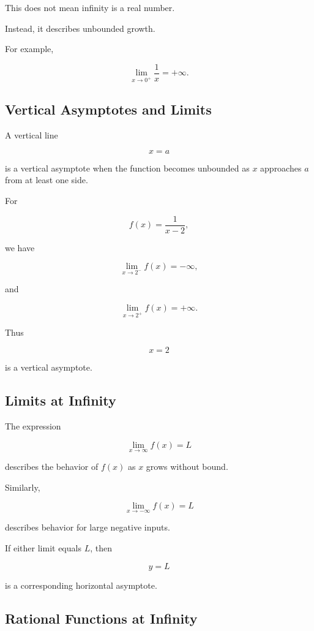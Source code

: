 This does not mean infinity is a real number.

Instead, it describes unbounded growth.

For example,

\[ \lim_{x\to0^+}\frac1x=+\infty. \]

\subsection{Vertical Asymptotes and Limits}
\label{subsec:vertical-asymptotes-limits}

A vertical line

\[ x=a \]

is a vertical asymptote when the function becomes unbounded as \(x\)
approaches \(a\) from at least one side.

For

\[ f(x)=\frac1{x-2}, \]

we have

\[ \lim_{x\to2^-}f(x)=-\infty, \]

and

\[ \lim_{x\to2^+}f(x)=+\infty. \]

Thus

\[ x=2 \]

is a vertical asymptote.

\subsection{Limits at Infinity}
\label{subsec:limits-at-infinity}

The expression

\[ \lim_{x\to\infty}f(x)=L \]

describes the behavior of \(f(x)\) as \(x\) grows without bound.

Similarly,

\[ \lim_{x\to-\infty}f(x)=L \]

describes behavior for large negative inputs.

If either limit equals \(L\), then

\[ y=L \]

is a corresponding horizontal asymptote.

\subsection{Rational Functions at Infinity}
\label{subsec:rational-limits-infinity}

